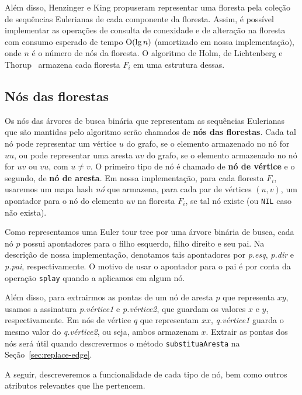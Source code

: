 \raggedbottom

Além disso, Henzinger e King \cite{henzinger_king} propuseram representar uma floresta pela coleção de sequências Eulerianas de cada componente da floresta. Assim, é possível implementar as operações de consulta de conexidade e de alteração na floresta com consumo esperado de tempo $\mathrm{O}(\lg n)$ (amortizado em nossa implementação), onde $n$ é o número de nós da floresta. O algoritmo de Holm, de Lichtenberg e Thorup~\cite{jacob_holm} armazena cada floresta $F_i$ em uma estrutura dessas.

\subsection{Nós das florestas}
\label{sec:graph-nodes}

Os nós das árvores de busca binária que representam as sequências Eulerianas que são mantidas pelo algoritmo serão chamados de \textbf{nós das florestas}. Cada tal nó pode representar um vértice $u$ do grafo, se o elemento armazenado no nó for $uu$, ou pode representar uma aresta $uv$ do grafo, se o elemento armazenado no nó for $uv$ ou $vu$, com $u \neq v$. O primeiro tipo de nó é chamado de \textbf{nó de vértice} e o segundo, de \textbf{nó de aresta}. Em nossa implementação, para cada floresta $F_i$, usaremos um mapa hash \textit{nó} que armazena, para cada par de vértices $(u, v)$, um apontador para o nó do elemento $uv$ na floresta $F_i$, se tal nó existe (ou \texttt{NIL} caso não exista).

Como representamos uma Euler tour tree por uma árvore binária de busca, cada nó $p$ possui apontadores para o filho esquerdo, filho direito e seu pai. Na descrição de nossa implementação, denotamos tais apontadores por \textit{p.esq}, \textit{p.dir} e \textit{p.pai}, respectivamente. O motivo de usar o apontador para o pai é por conta da operação \texttt{splay} quando a aplicamos em algum nó.

Além disso, para extrairmos as pontas de um nó de aresta $p$ que representa $xy$, usamos a assinatura \textit{p.vértice1} e \textit{p.vértice2}, que guardam os valores  $x$ e $y$, respectivamente. Em nós de vértice $q$ que representam $xx$, \textit{q.vértice1} guarda o mesmo valor do \textit{q.vértice2}, ou seja, ambos armazenam $x$. Extrair as pontas dos nós será útil quando descrevermos o método \texttt{substituaAresta} na Seção~\ref{sec:replace-edge}. 

A seguir, descreveremos a funcionalidade de cada tipo de nó, bem como outros atributos relevantes que lhe pertencem. 

